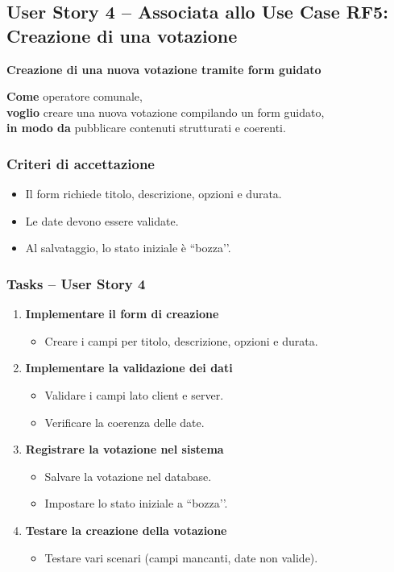 \documentclass{article}
\begin{document}

\subsection{User Story 4 -- Associata allo Use Case RF5: Creazione di una votazione}

\textbf{Creazione di una nuova votazione tramite form guidato}

\textbf{Come} operatore comunale,\\
\textbf{voglio} creare una nuova votazione compilando un form guidato,\\
\textbf{in modo da} pubblicare contenuti strutturati e coerenti.

\subsubsection{Criteri di accettazione}
\begin{itemize}
    \item Il form richiede titolo, descrizione, opzioni e durata.
    \item Le date devono essere validate.
    \item Al salvataggio, lo stato iniziale è ``bozza’’.
\end{itemize}

\subsubsection{Tasks -- User Story 4}
\begin{enumerate}
    \item \textbf{Implementare il form di creazione}
    \begin{itemize}
        \item Creare i campi per titolo, descrizione, opzioni e durata.
    \end{itemize}

    \item \textbf{Implementare la validazione dei dati}
    \begin{itemize}
        \item Validare i campi lato client e server.
        \item Verificare la coerenza delle date.
    \end{itemize}

    \item \textbf{Registrare la votazione nel sistema}
    \begin{itemize}
        \item Salvare la votazione nel database.
        \item Impostare lo stato iniziale a ``bozza’’.
    \end{itemize}

    \item \textbf{Testare la creazione della votazione}
    \begin{itemize}
        \item Testare vari scenari (campi mancanti, date non valide).
    \end{itemize}
\end{enumerate}
\end{document}
